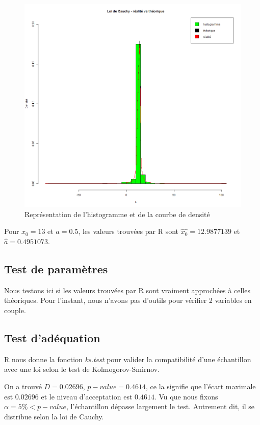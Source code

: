 \documentclass[12pt,a4paper,titlepage]{article}
\numberwithin{equation}{section}
\begin{document}
\begin{figure}[h]
\includegraphics[width=\linewidth]{images/Cauchy_real_vs_theo.png}
\caption{Représentation de l'histogramme et de la courbe de densité}
\end{figure}

Pour $x_0=13$ et $a=0.5$, les valeurs trouvées par R sont $\hat{x_0} = 12.9877139$ et $\hat{a} = 0.4951073$.

\subsection{Test de paramètres}

Nous testons ici si les valeurs trouvées par R sont vraiment approchées à celles théoriques. Pour l'instant, nous n'avons pas d'outils pour vérifier 2 variables en couple.

\subsection{Test d'adéquation}

R nous donne la fonction \emph{ks.test} pour valider la compatibilité d'une échantillon avec une loi selon le test de Kolmogorov-Smirnov.



On a trouvé $D = 0.02696$, $p-value = 0.4614$, ce la signifie que l'écart maximale est $0.02696$ et le niveau d'acceptation est $0.4614$. Vu que nous fixons $\alpha = 5\% < p-value$, l'échantillon dépasse largement le test. Autrement dit, il se distribue selon la loi de Cauchy.
\end{document}
